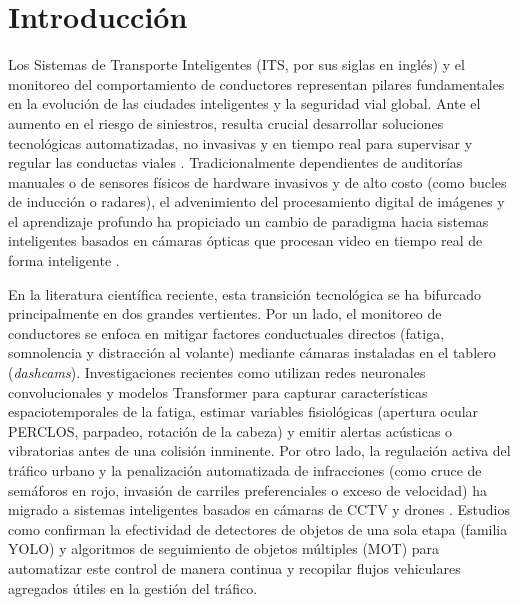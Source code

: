 \section{Introducción}

Los Sistemas de Transporte Inteligentes (ITS, por sus siglas en inglés) y el monitoreo del comportamiento de conductores representan pilares fundamentales en la evolución de las ciudades inteligentes y la seguridad vial global. Ante el aumento en el riesgo de siniestros, resulta crucial desarrollar soluciones tecnológicas automatizadas, no invasivas y en tiempo real para supervisar y regular las conductas viales \cite{kumar2026intelligent, ahmad2026comparative}. Tradicionalmente dependientes de auditorías manuales o de sensores físicos de hardware invasivos y de alto costo (como bucles de inducción o radares), el advenimiento del procesamiento digital de imágenes y el aprendizaje profundo ha propiciado un cambio de paradigma hacia sistemas inteligentes basados en cámaras ópticas que procesan video en tiempo real de forma inteligente \cite{kumar2026uavbased, chen2026hybrid}.

En la literatura científica reciente, esta transición tecnológica se ha bifurcado principalmente en dos grandes vertientes. Por un lado, el monitoreo de conductores se enfoca en mitigar factores conductuales directos (fatiga, somnolencia y distracción al volante) mediante cámaras instaladas en el tablero (\textit{dashcams}). Investigaciones recientes como \cite{liu2026research, abarghooei2026driving, hu2026trustworthy, srivastava2026traffic, pavan2026aipowered} utilizan redes neuronales convolucionales y modelos Transformer para capturar características espaciotemporales de la fatiga, estimar variables fisiológicas (apertura ocular PERCLOS, parpadeo, rotación de la cabeza) y emitir alertas acústicas o vibratorias antes de una colisión inminente. Por otro lado, la regulación activa del tráfico urbano y la penalización automatizada de infracciones (como cruce de semáforos en rojo, invasión de carriles preferenciales o exceso de velocidad) ha migrado a sistemas inteligentes basados en cámaras de CCTV y drones \cite{zia2025advancing, bhavsar2025evaluating}. Estudios como \cite{zambrano2026monitoring, rahman2026costeffective, l2026safestreets} confirman la efectividad de detectores de objetos de una sola etapa (familia YOLO) y algoritmos de seguimiento de objetos múltiples (MOT) para automatizar este control de manera continua y recopilar flujos vehiculares agregados útiles en la gestión del tráfico.

